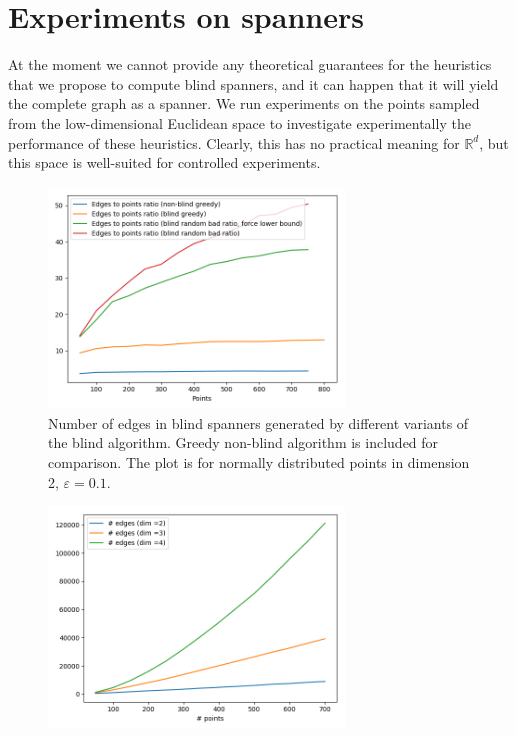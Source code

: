 \documentclass[a4paper,USenglish]{socg-lipics-v2018}
\newcommand{\R}{\mathbb{R}}
\newcommand{\eps}{\varepsilon}
\begin{document}
\section{Experiments on spanners}
At the moment we cannot provide any theoretical guarantees for the heuristics that we propose to compute blind spanners,
and it can happen that it will yield the complete graph as a spanner.
We run experiments on the points sampled from the low-dimensional Euclidean space to investigate
experimentally the performance of these heuristics. Clearly, this has no practical meaning for $\R^d$, but
this space is well-suited for controlled experiments.

\begin{figure}[ht]
    \label{fig:spanner-sparseness}
    \includegraphics[width=0.7\textwidth]{pics/edges_to_points_ratio_dim_2_normal_points.png}
    \caption{Number of edges in blind spanners generated by different variants of the blind
    algorithm. Greedy non-blind algorithm is included for comparison. The plot is for normally distributed points
    in dimension 2, $\eps = 0.1$.}
\end{figure}

\begin{figure}[ht]
    \label{fig:blind-greedy-only}
    \includegraphics[width=0.7\textwidth]{pics/blind-greedy-dims.png}
    \caption{}
\end{figure}
\end{document}
